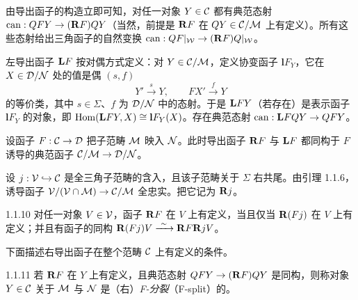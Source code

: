
由导出函子的构造立即可知，对任一对象 $Y\in\mathcal{C}$ 都有典范态射 $\mathrm{can}:QFY\to(\mathbf{R} F)QY$（当然，前提是 $\mathbf{R} F$ 在 $QY\in\mathcal{C}/\mathcal{M}$ 上有定义）。所有这些态射给出三角函子的自然变换 $\mathrm{can}:QF|_{\mathcal{W}}\to(\mathbf{R} F)Q|_{\mathcal{W}}$。

左导出函子 $\mathbf{L} F$ 按对偶方式定义：对 $Y\in\mathcal{C}/\mathcal{M}$，定义协变函子 $\mathbf{l}F_Y$，它在 $X\in\mathcal{D}/\mathcal{N}$ 处的值是偶 $(s,f)$
\begin{equation*}
Y'\xrightarrow{\ s\ }Y,\qquad FX'\xrightarrow{\ f\ }Y
\end{equation*}
的等价类，其中 $s\in\Sigma$、$f$ 为 $\mathcal{D}/\mathcal{N}$ 中的态射。于是 $\mathbf{L} FY$（若存在）是表示函子 $\mathbf{l}F_Y$ 的对象，即 $\operatorname{Hom}(\mathbf{L} FY,X)\cong\mathbf{l}F_Y(X)$。存在典范态射 $\mathrm{can}:\mathbf{L} FQY\to QFY$。

设函子 $F:\mathcal{C}\to\mathcal{D}$ 把子范畴 $\mathcal{M}$ 映入 $\mathcal{N}$。此时导出函子 $\mathbf{R} F$ 与 $\mathbf{L} F$ 都同构于 $F$ 诱导的典范函子 $\mathcal{C}/\mathcal{M}\to\mathcal{D}/\mathcal{N}$。

设 $j:\mathcal{V}\hookrightarrow\mathcal{C}$ 是全三角子范畴的含入，且该子范畴关于 $\Sigma$ 右共尾。由引理 1.1.6，诱导函子 $\mathcal{V}/(\mathcal{V}\cap\mathcal{M})\to\mathcal{C}/\mathcal{M}$ 全忠实。把它记为 $\mathbf{R} j$。

\begin{lemma}{1.1.10}
对任一对象 $V\in\mathcal{V}$，函子 $\mathbf{R} F$ 在 $V$ 上有定义，当且仅当 $\mathbf{R}(Fj)$ 在 $V$ 上有定义；并且有函子的同构 $\mathbf{R}(Fj)V\xrightarrow{\ \sim\ }\mathbf{R} F\mathbf{R} jV$。
\end{lemma}

下面描述右导出函子在整个范畴 $\mathcal{C}$ 上有定义的条件。

\begin{definition}{1.1.11}
若 $\mathbf{R} F$ 在 $Y$ 上有定义，且典范态射 $QFY\to(\mathbf{R} F)QY$ 是同构，则称对象 $Y\in\mathcal{C}$ 关于 $\mathcal{M}$ 与 $\mathcal{N}$ 是（右）\emph{F-分裂}（F-split）的。
\end{definition}


